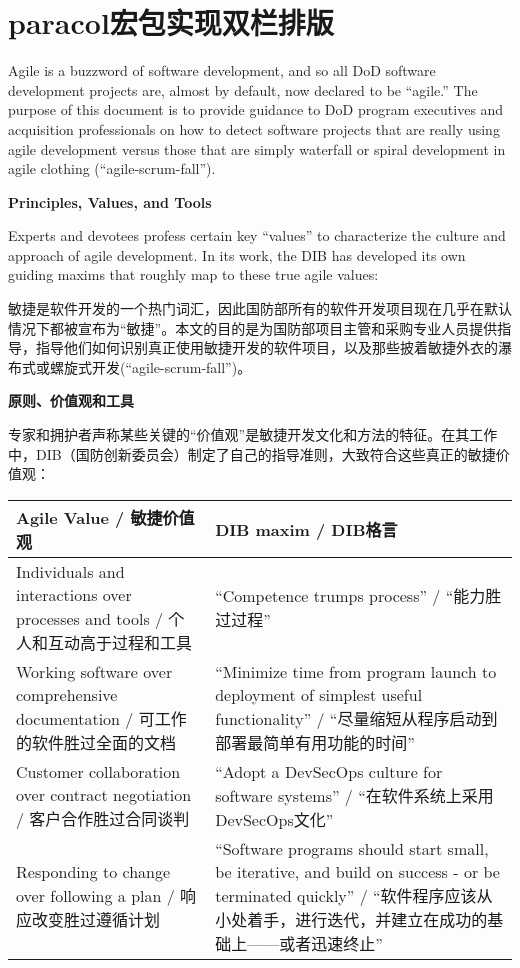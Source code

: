 \documentclass[UTF8, oneside]{ctexbook}
\begin{document}
\chapter{paracol宏包实现双栏排版}
\begin{paracol}{2}
  \begin{leftcolumn}
    Agile is a buzzword of software development, and so all DoD software development projects are, almost by default, now declared to be “agile.” The purpose of this document is to provide guidance to DoD program executives and acquisition professionals on how to detect software projects that are really using agile development versus those that are simply waterfall or spiral development in agile clothing (“agile-scrum-fall”).
    
    \large\textbf{Principles, Values, and Tools}
    
    Experts and devotees profess certain key “values” to characterize the culture and approach of agile development. In its work, the DIB has developed its own guiding maxims that roughly map to these true agile values:
  \end{leftcolumn}
  \begin{rightcolumn}
    敏捷是软件开发的一个热门词汇，因此国防部所有的软件开发项目现在几乎在默认情况下都被宣布为“敏捷”。本文的目的是为国防部项目主管和采购专业人员提供指导，指导他们如何识别真正使用敏捷开发的软件项目，以及那些披着敏捷外衣的瀑布式或螺旋式开发(“agile-scrum-fall”)。

    \large\textbf{原则、价值观和工具}

    专家和拥护者声称某些关键的“价值观”是敏捷开发文化和方法的特征。在其工作中，DIB（国防创新委员会）制定了自己的指导准则，大致符合这些真正的敏捷价值观：
  \end{rightcolumn}

  \switchcolumn*
  \noindent
  \begin{tabular}{|p{}|p{}|}
    \hline
    \textbf{Agile Value / 敏捷价值观} & \textbf{DIB maxim / DIB格言}\\
    \hline
    Individuals and interactions over processes and tools / 个人和互动高于过程和工具 & “Competence trumps process” / “能力胜过过程”\\
    \hline
    Working software over comprehensive documentation / 可工作的软件胜过全面的文档 & “Minimize time from program launch to deployment of simplest useful functionality” / “尽量缩短从程序启动到部署最简单有用功能的时间”\\
    \hline
    Customer collaboration over contract negotiation / 客户合作胜过合同谈判 & “Adopt a DevSecOps culture for software systems” / “在软件系统上采用DevSecOps文化”\\
    \hline
    Responding to change over following a plan / 响应改变胜过遵循计划 & “Software programs should start small, be iterative, and build on success - or be terminated quickly” / “软件程序应该从小处着手，进行迭代，并建立在成功的基础上——或者迅速终止”\\
    \hline
  \end{tabular}
  

\end{paracol}
\end{document}
